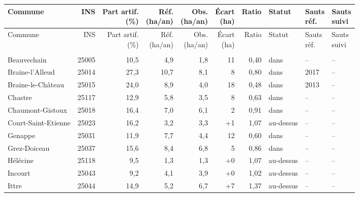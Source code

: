 \begin{longtable}{lrrrrrrlll}
\toprule
Commune & INS & \makecell{Part artif.\\(\%)} & \makecell{Réf.\\(ha/an)} & \makecell{Obs.\\(ha/an)} & \makecell{Écart\\(ha)} & Ratio & Statut & \makecell{Sauts\\réf.} & \makecell{Sauts\\suivi} \\
\midrule
\endfirsthead
\toprule
Commune & INS & \makecell{Part artif.\\(\%)} & \makecell{Réf.\\(ha/an)} & \makecell{Obs.\\(ha/an)} & \makecell{Écart\\(ha)} & Ratio & Statut & \makecell{Sauts\\réf.} & \makecell{Sauts\\suivi} \\
\midrule
\endhead
\bottomrule
\endfoot
\multicolumn{10}{l}{\textbf{Brabant wallon} (27 communes)} \\
Beauvechain & 25005 & 10{,}5 & 4{,}9 & 1{,}8 & \textminus{}11 & 0{,}40 & dans & -- & -- \\
Braine-l'Alleud & 25014 & 27{,}3 & 10{,}7 & 8{,}1 & \textminus{}8 & 0{,}80 & dans & 2017 & -- \\
Braine-le-Château & 25015 & 24{,}0 & 8{,}9 & 4{,}0 & \textminus{}18 & 0{,}48 & dans & 2013 & -- \\
Chastre & 25117 & 12{,}9 & 5{,}8 & 3{,}5 & \textminus{}8 & 0{,}63 & dans & -- & -- \\
Chaumont-Gistoux & 25018 & 16{,}4 & 7{,}0 & 6{,}1 & \textminus{}2 & 0{,}91 & dans & -- & -- \\
Court-Saint-Etienne & 25023 & 16{,}2 & 3{,}2 & 3{,}3 & +1 & 1{,}07 & au-dessus & -- & -- \\
Genappe & 25031 & 11{,}9 & 7{,}7 & 4{,}4 & \textminus{}12 & 0{,}60 & dans & -- & -- \\
Grez-Doiceau & 25037 & 15{,}6 & 8{,}4 & 6{,}8 & \textminus{}5 & 0{,}86 & dans & -- & -- \\
Hélécine & 25118 & 9{,}5 & 1{,}3 & 1{,}3 & +0 & 1{,}07 & au-dessus & -- & -- \\
Incourt & 25043 & 9{,}2 & 4{,}1 & 3{,}9 & +0 & 1{,}02 & au-dessus & -- & -- \\
Ittre & 25044 & 14{,}9 & 5{,}2 & 6{,}7 & +7 & 1{,}37 & au-dessus & -- & -- \\

\end{longtable}
